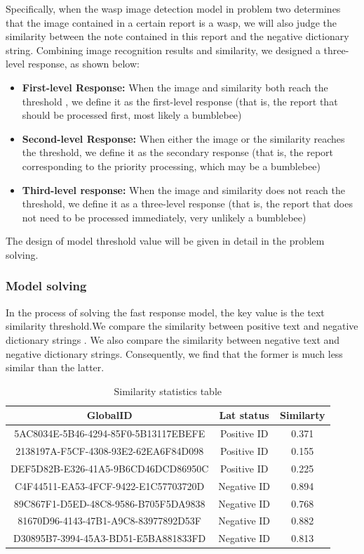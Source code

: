 \documentclass{mcmthesis}
\begin{document}
Specifically, when the wasp image detection model in problem two determines that the image contained in a certain report is a wasp, we will also judge the similarity between the note contained in this report and the negative dictionary string. Combining image recognition results and similarity, we designed a three-level response, as shown below:
\begin{itemize}
	\item \textbf{First-level Response:} When the image and similarity both reach the threshold , we define it as the first-level response (that is, the report that should be processed first, most likely a bumblebee)
	\item \textbf{Second-level Response:} When either the image or the similarity reaches the threshold, we define it as the secondary response (that is, the report corresponding to the priority processing, which may be a bumblebee)
	\item \textbf{Third-level response:} When the image and similarity does not reach the threshold, we define it as a three-level response (that is, the report that does not need to be processed immediately, very unlikely a bumblebee)
\end{itemize}

The design of model threshold value will be given in detail in the problem solving.

\hspace*{\fill}
\subsubsection{Model solving}
In the process of solving the fast response model, the key value is the text similarity threshold.We compare the similarity between positive text and negative dictionary strings . We also compare the similarity between negative text and negative dictionary strings. Consequently, we  find that the former is much less similar than the latter.

\begin{table}[H]   %
	\centering\caption{Similarity statistics table}
	\begin{tabular}{ccc}
		\toprule[1.5pt]
GlobalID&	Lat status&	Similarty\\
		\midrule[1pt]
{5AC8034E-5B46-4294-85F0-5B13117EBEFE}&	Positive ID	&0.371\\
{2138197A-F5CF-4308-93E2-62EA6F84D098}&	Positive ID	&0.155\\
{DEF5D82B-E326-41A5-9B6CD46DCD86950C}&	Positive ID	&0.225\\
{C4F44511-EA53-4FCF-9422-E1C57703720D}&Negative ID&	0.894\\
{89C867F1-D5ED-48C8-9586-B705F5DA9838}&Negative ID&	0.768\\
{81670D96-4143-47B1-A9C8-83977892D53F}&	Negative ID	&0.882\\
{D30895B7-3994-45A3-BD51-E5BA881833FD}&Negative ID	&0.813\\
		\bottomrule[1.5pt]
	\end{tabular}
\end{table}
\end{document}
